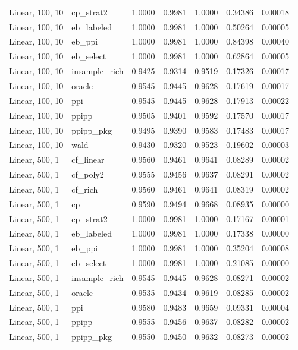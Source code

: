 \begin{longtable}{llrrrrr}
Linear, 100, 10 & cp\_strat2 & 1.0000 & 0.9981 & 1.0000 & 0.34386 & 0.00018 \\
Linear, 100, 10 & eb\_labeled & 1.0000 & 0.9981 & 1.0000 & 0.50264 & 0.00005 \\
Linear, 100, 10 & eb\_ppi & 1.0000 & 0.9981 & 1.0000 & 0.84398 & 0.00040 \\
Linear, 100, 10 & eb\_select & 1.0000 & 0.9981 & 1.0000 & 0.62864 & 0.00005 \\
Linear, 100, 10 & insample\_rich & 0.9425 & 0.9314 & 0.9519 & 0.17326 & 0.00017 \\
Linear, 100, 10 & oracle & 0.9545 & 0.9445 & 0.9628 & 0.17619 & 0.00017 \\
Linear, 100, 10 & ppi & 0.9545 & 0.9445 & 0.9628 & 0.17913 & 0.00022 \\
Linear, 100, 10 & ppipp & 0.9505 & 0.9401 & 0.9592 & 0.17570 & 0.00017 \\
Linear, 100, 10 & ppipp\_pkg & 0.9495 & 0.9390 & 0.9583 & 0.17483 & 0.00017 \\
Linear, 100, 10 & wald & 0.9430 & 0.9320 & 0.9523 & 0.19602 & 0.00003 \\
Linear, 500, 1 & cf\_linear & 0.9560 & 0.9461 & 0.9641 & 0.08289 & 0.00002 \\
Linear, 500, 1 & cf\_poly2 & 0.9555 & 0.9456 & 0.9637 & 0.08291 & 0.00002 \\
Linear, 500, 1 & cf\_rich & 0.9560 & 0.9461 & 0.9641 & 0.08319 & 0.00002 \\
Linear, 500, 1 & cp & 0.9590 & 0.9494 & 0.9668 & 0.08935 & 0.00000 \\
Linear, 500, 1 & cp\_strat2 & 1.0000 & 0.9981 & 1.0000 & 0.17167 & 0.00001 \\
Linear, 500, 1 & eb\_labeled & 1.0000 & 0.9981 & 1.0000 & 0.17338 & 0.00000 \\
Linear, 500, 1 & eb\_ppi & 1.0000 & 0.9981 & 1.0000 & 0.35204 & 0.00008 \\
Linear, 500, 1 & eb\_select & 1.0000 & 0.9981 & 1.0000 & 0.21085 & 0.00000 \\
Linear, 500, 1 & insample\_rich & 0.9545 & 0.9445 & 0.9628 & 0.08271 & 0.00002 \\
Linear, 500, 1 & oracle & 0.9535 & 0.9434 & 0.9619 & 0.08285 & 0.00002 \\
Linear, 500, 1 & ppi & 0.9580 & 0.9483 & 0.9659 & 0.09331 & 0.00004 \\
Linear, 500, 1 & ppipp & 0.9555 & 0.9456 & 0.9637 & 0.08282 & 0.00002 \\
Linear, 500, 1 & ppipp\_pkg & 0.9550 & 0.9450 & 0.9632 & 0.08273 & 0.00002 \\

\end{longtable}
